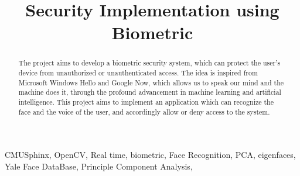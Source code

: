 \documentclass[conference]{IEEEtran}
\begin{document}
%
\title{Security Implementation using Biometric}

\author{
        }




\maketitle

\begin{abstract}
The project aims to develop a biometric security system, which can protect the
user's device from unauthorized or unauthenticated access. The
idea is inspired from Microsoft Windows Hello and Google Now, which allows us
to speak our mind and the machine does it, through the profound
advancement in machine learning and artificial intelligence. This project aims
to implement an application which can recognize the face and the voice of
the user, and accordingly allow or deny access to the system.
\end{abstract}


\begin{IEEEkeywords}
CMUSphinx, OpenCV, Real time, biometric, Face Recognition, PCA, eigenfaces,
Yale Face DataBase, Principle Component Analysis,
\end{IEEEkeywords}
\end{document}
